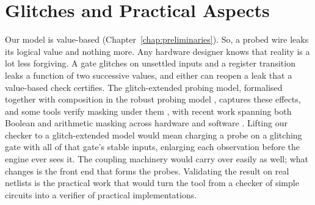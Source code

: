 \section{Glitches and Practical Aspects}
\label{sec:fw-glitches}

Our model is value-based (Chapter~\ref{chap:preliminaries}). So, a probed wire leaks
its logical value and nothing more. Any hardware designer knows that reality is a lot less forgiving. A gate
glitches on unsettled inputs and a register transition leaks a function of two
successive values, and either can reopen a leak that a value-based check certifies.
The glitch-extended probing model, formalised together with composition in
the robust probing model \parencite{faust2018robust}, captures these effects, and
some tools verify masking under them \parencite{bloem2018formal,
10.1007/978-3-030-29959-0_15}, with recent work spanning both Boolean and
arithmetic masking across hardware and software \parencite{gigerl2023formal}.
Lifting our checker to a glitch-extended model would mean charging a probe on a
glitching gate with all of that gate's stable inputs, enlarging each observation
before the engine ever sees it. The coupling machinery would carry over easily as well;
what changes is the front end that forms the probes. Validating the result on real
netlists is the practical work that would turn the tool from a checker of simple circuits
into a verifier of practical implementations.
